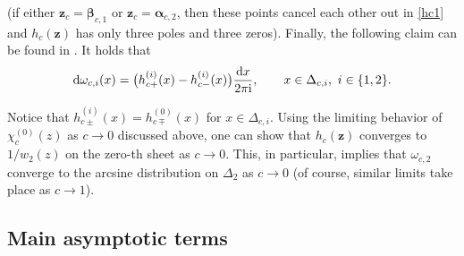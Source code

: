 \documentclass[pdftex]{sigma}
\numberwithin{equation}{section}
\newcommand{\ic}{\mathrm{i}}
\newcommand{\z}	{{\boldsymbol z}}
\begin{document}
(if either $ \z_c=\boldsymbol\beta_{c,1} $ or $ \z_c=\boldsymbol\alpha_{c,2} $, then these points cancel each other out in \eqref{hc1} and $ h_c(\z) $ has only three poles and three zeros). Finally, the following claim can be found in \cite[Section~4]{ApDenYa21}. It holds that
\begin{equation}
\label{eq_meas}
{\rm d}\omega_{c,i}(x) = \bigl( h_{c+}^{(i)}(x)-h_{c-}^{(i)}(x) \bigr)\frac{{\rm d}x}{2\pi\ic}, \qquad x\in\Delta_{c,i}, \ i\in\{1,2\}.
\end{equation}

Notice that $ h_{c\pm}^{(i)}(x) = h^{(0)}_{c\mp}(x) $ for $ x\in\Delta_{c,i} $. Using the limiting behavior of $ \chi_c^{(0)}(z) $ as $ c\to0 $ discussed above, one can show that $ h_c(\z) $ converges to $ 1/w_2(z) $ on the zero-th sheet as $ c\to0 $. This, in particular, implies that $ \omega_{c,2} $ converge to the arcsine distribution on $ \Delta_2 $ as $ c\to 0 $ (of course, similar limits take place as $ c\to1 $).


\subsection{Main asymptotic terms}
\end{document}
